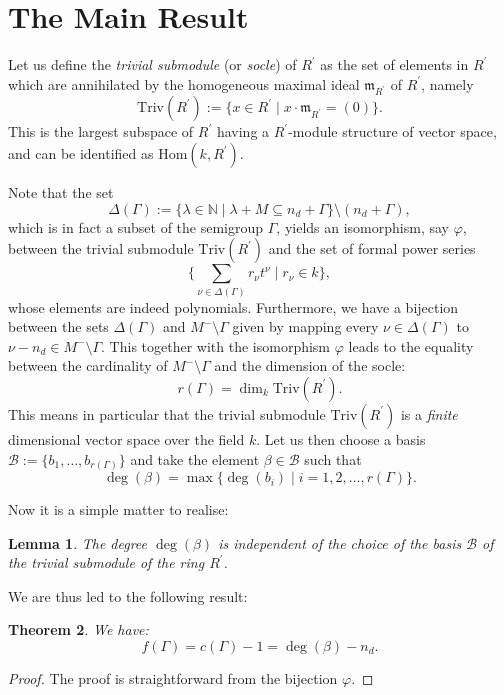 \documentclass[12pt,reqno]{amsart}
\newtheorem{theorem}{Theorem}[section]
\newtheorem{lemma}[theorem]{Lemma}
\theoremstyle{definition}
\numberwithin{equation}{section}
\begin{document}
\section{The Main Result}

\noindent Let us define the \emph{trivial submodule} (or \emph{socle}) of $R^{\prime}$ as the set of elements in $R^{\prime}$ which are annihilated by the homogeneous maximal ideal $\mathfrak{m}_{R^{\prime}}$ of $R^{\prime}$, namely
\[
\mathrm{Triv}(R^{\prime}):=\{x \in R^{\prime} \mid x \cdot \mathfrak{m}_{R^{\prime}} = (0)\}.
\]
\noindent This is the largest subspace of $R^{\prime}$ having a $R^{\prime}$-module structure of vector space, and can be identified as $\mathrm{Hom}(k,R^{\prime})$.
\medskip

\noindent Note that the set
\[
\Delta(\Gamma):=\{\lambda \in \mathbb{N} \mid \lambda + M \subseteq n_d+\Gamma\} \setminus (n_d+\Gamma),
\]
which is in fact a subset of the semigroup $\Gamma$, yields an isomorphism, say $\varphi$, between the trivial submodule $\mathrm{Triv}(R^{\prime})$ and the set of formal power series
\[
\Big \{\sum_{\nu \in \Delta(\Gamma)} r_{\nu} t^{\nu} \mid r_{\nu} \in k \Big \},
\]
whose elements are indeed polynomials. Furthermore, we have a bijection between the sets $\Delta(\Gamma)$ and $M^{-} \setminus \Gamma$ given by mapping every $\nu \in \Delta(\Gamma)$ to $\nu-n_d \in M^{-} \setminus \Gamma$. This together with the isomorphism $\varphi$ leads to the equality between the cardinality of $M^{-} \setminus \Gamma$ and the dimension of the socle:
\[
r(\Gamma)=\dim_k \mathrm{Triv}(R^{\prime}). 
\]
\noindent This means in particular that the trivial submodule $\mathrm{Triv}(R^{\prime})$ is a \emph{finite} dimensional vector space over the field $k$. Let us then choose a basis $\mathcal{B}:= \{b_1, \ldots , b_{r(\Gamma)}\}$ and take the element $\beta \in \mathcal{B}$ such that 
\[
\deg (\beta) = \max \{\deg (b_i) \mid i =1, 2, \ldots , r(\Gamma) \}.
\]

\noindent Now it is a simple matter to realise:

\begin{lemma}
The degree $\deg (\beta)$ is independent of the choice of the basis $\mathcal{B}$ of the trivial submodule of the ring $R^{\prime}$.
\end{lemma}

\noindent We are thus led to the following result:
\begin{theorem}
We have:
\[
f(\Gamma)=c(\Gamma)-1=\deg (\beta) - n_d.
\]
\end{theorem}
\begin{proof}
The proof is straightforward from the bijection $\varphi$.
\end{proof}
\end{document}

